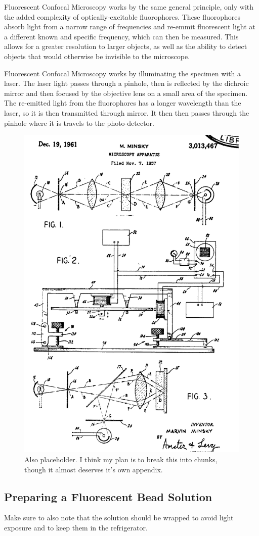 Fluorescent Confocal Microscopy works by the same general principle, only with the added complexity of optically-excitable fluorophores. These fluorophores absorb light from a narrow range of frequencies and re-emmit fluorescent light at a different known and specific frequency, which can then be measured. This allows for a greater resolution to larger objects, as well as the ability to detect objects that would otherwise be invisible to the microscope.  

Fluorescent Confocal Microscopy works by illuminating the specimen with a laser. The laser light passes through a pinhole, then is reflected by the dichroic mirror and then focused by the objective lens on a small area of the specimen. The re-emitted light from the fluorophores has a longer wavelength than the laser, so it is then transmitted through mirror.  It then then passes through the pinhole where it is travels to the photo-detector.

\begin{figure}[h!]
	\centering
	\includegraphics[width=.3\linewidth]{confocal_stuff/confocalpatent}
	\caption[Minsky Patent Diagram]{Also placeholder. I think my plan is to break this into chunks, though it almost deserves it's own appendix.}
	\label{fig:confocalpatent}
\end{figure}
\cite{patent:3013467} 

\subsection{Preparing a Fluorescent Bead Solution}
Make sure to also note that the solution should be wrapped to avoid light exposure and to keep them in the refrigerator. 

